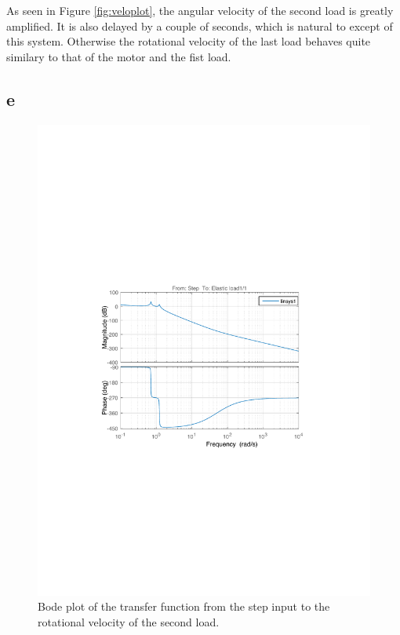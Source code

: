 \documentclass{article}
\begin{document}
As seen in Figure \ref{fig:veloplot}, the angular velocity of the second load is greatly amplified. It is also delayed by a couple of seconds, which is natural to except of this system. Otherwise the rotational velocity of the last load behaves quite similary to that of the motor and the fist load.

\subsection{e}

\begin{figure}[!ht]
    \centering
    \includegraphics[width = \textwidth]{ex1_2_bode}
    \caption{Bode plot of the transfer function from the step input to the rotational velocity of the second load.}
    \label{fig:bodeSimu} 
\end{figure}
\end{document}
